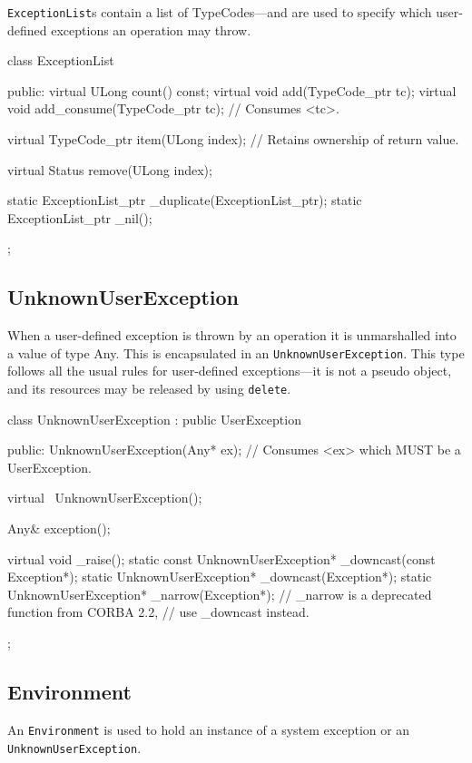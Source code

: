 \documentclass[11pt,twoside,a4paper]{book}
\newcommand{\type}[1]{\texttt{#1}}
\newcommand{\code}[1]{\texttt{#1}}
\begin{document}
\type{ExceptionList}s contain a list of TypeCodes---and are used to
specify which user-defined exceptions an operation may throw.

\begin{cxxlisting}
class ExceptionList {
public:
  virtual ULong count() const;
  virtual void add(TypeCode_ptr tc);
  virtual void add_consume(TypeCode_ptr tc);
  // Consumes <tc>.

  virtual TypeCode_ptr item(ULong index);
  // Retains ownership of return value.

  virtual Status remove(ULong index);

  static ExceptionList_ptr _duplicate(ExceptionList_ptr);
  static ExceptionList_ptr _nil();
};
\end{cxxlisting}



\subsection{UnknownUserException}

When a user-defined exception is thrown by an operation it is
unmarshalled into a value of type Any. This is encapsulated in an
\type{UnknownUserException}. This type follows all the usual rules for
user-defined exceptions---it is not a pseudo object, and its resources
may be released by using \code{delete}.

\begin{cxxlisting}
class UnknownUserException : public UserException {
public:
  UnknownUserException(Any* ex);
  // Consumes <ex> which MUST be a UserException.

  virtual ~UnknownUserException();

  Any& exception();

  virtual void _raise();
  static const UnknownUserException* _downcast(const Exception*);
  static UnknownUserException* _downcast(Exception*);
  static UnknownUserException* _narrow(Exception*); 
  // _narrow is a deprecated function from CORBA 2.2, 
  // use _downcast instead.
};
\end{cxxlisting}



\subsection{Environment}

An \type{Environment} is used to hold an instance of a system
exception or an \type{UnknownUserException}.
\end{document}

